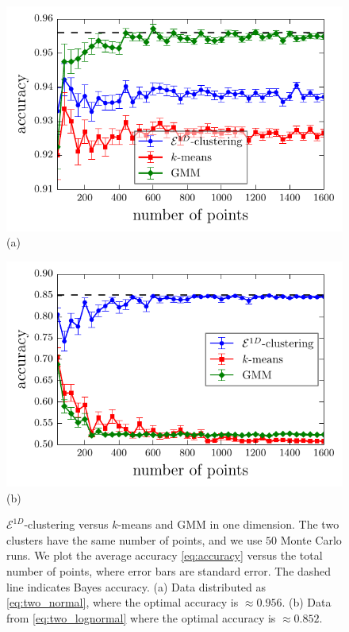 \documentclass[aps,preprint,nofootinbib,floatfix]{revtex4-1}
\begin{document}
\begin{figure}
\begin{minipage}{0.49\textwidth}
\includegraphics[width=\textwidth]{1D_normal.pdf}\\[-1em](a)
\end{minipage}
\begin{minipage}{0.49\textwidth}
\includegraphics[width=\textwidth]{1D_lognormal.pdf}\\[-.8em](b)
\end{minipage}
\caption{
\label{fig:1d}
$\mathcal{E}^{1D}$-clustering versus $k$-means and GMM in one dimension.
The two clusters have the same number of points, and we use
$50$ Monte Carlo runs.
We plot the average 
accuracy \eqref{eq:accuracy} versus the total number of points, 
where error bars are standard error. The dashed line indicates 
Bayes accuracy. (a) Data distributed as \eqref{eq:two_normal}, where the
optimal accuracy is $\approx 0.956$.
(b) Data from \eqref{eq:two_lognormal} where the optimal
accuracy is $\approx 0.852$.
}
\end{figure}
\end{document}
